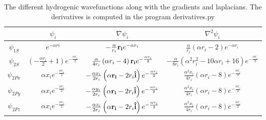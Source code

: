 		\begin{table}
			\begin{center}
				\begin{tabular}{| c | c | c | c |}
				\bottomrule
				& \( \psi_i\)	& \( \nabla\psi_i \) & \( \nabla^2\psi_i \)
				\\ \hline
					\(\psi_{1S}\)
					&
					\( e^{- \alpha ri} \)
					&
					\( - \frac{\alpha}{r_{i}} \vb{r_i}e^{- \alpha r_{i}} \)
					&
					\(\frac{\alpha}{r_{i}} \left(\alpha r_{i} - 2\right) e^{- \alpha r_{i}} \)
				\\	\hline
					\(\psi_{2S}\)
					&
					\( \left(- \frac{\alpha r_{i}}{2} + 1\right) e^{- \frac{\alpha r_{i}}{2}} \)
					&
					\( \frac{\alpha }{4 r_{i}} \left(\alpha r_{i} - 4\right) \vb{r_i} e^{- \frac{\alpha r_{i}}{2}}\)
					&
					\( - \frac{\alpha }{8 r_{i}} \left(\alpha^{2} r_{i}^{2} - 10 \alpha r_{i} + 16\right) e^{- \frac{\alpha r_{i}}{2}} \)
				\\	\hline
					\(\psi_{2Px}\)
					&
					\( \alpha x_{i} e^{- \frac{\alpha r_{i}}{2}} \)
					&
					\( - \frac{\alpha x_i}{2 r_{i}} \left(\alpha \vb{r_i} - 2 r_{i}\vu{i}\right) e^{- \frac{\alpha r_{i}}{2}} \)
					&
					\( \frac{\alpha^{2} x_{i}}{4 r_{i}} \left(\alpha r_{i} - 8\right) e^{- \frac{\alpha r_{i}}{2}} \)
				\\	\hline
					\(\psi_{2Py}\)
					&
					\( \alpha x_{i} e^{- \frac{\alpha r_{i}}{2}} \)
					&
					\( - \frac{\alpha y_i}{2 r_{i}} \left(\alpha \vb{r_i} - 2 r_{i}\vu{i}\right) e^{- \frac{\alpha r_{i}}{2}} \)
					&
					\( \frac{\alpha^{2} x_{i}}{4 r_{i}} \left(\alpha r_{i} - 8\right) e^{- \frac{\alpha r_{i}}{2}} \)
				\\	\hline
					\(\psi_{2Pz}\)
					&
					\( \alpha x_{i} e^{- \frac{\alpha r_{i}}{2}} \)
					&
					\( - \frac{\alpha z_i}{2 r_{i}} \left(\alpha \vb{r_i} - 2 r_{i}\vu{i}\right) e^{- \frac{\alpha r_{i}}{2}} \)
					&
					\( \frac{\alpha^{2} x_{i}}{4 r_{i}} \left(\alpha r_{i} - 8\right) e^{- \frac{\alpha r_{i}}{2}} \)
				\\ \toprule
				\end{tabular}
				\caption{The different hydrogenic wavefunctions along with the gradients and laplacians. The derivatives is computed in the program derivatives.py}
				\label{tab:hydrogenicWavefunctions}
			\end{center}
		\end{table}

